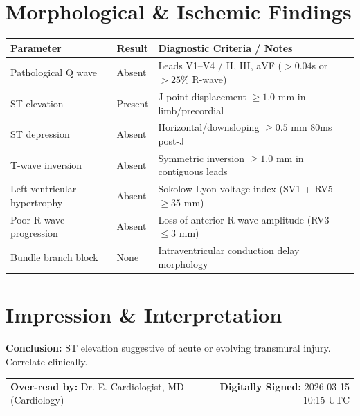 \documentclass[10pt,a4paper]{article}
\begin{document}
\section*{Morphological \& Ischemic Findings}

\begin{tabular}{@{} p{6.8cm} p{2.8cm} p{5.5cm} @{}}
  \toprule
  \textbf{Parameter} & \textbf{Result} & \textbf{Diagnostic Criteria / Notes} \\
  \midrule
  Pathological Q wave & Absent & Leads V1--V4 / II, III, aVF ($>0.04$s or $>25$\% R-wave) \\
  ST elevation & Present & J-point displacement $\ge 1.0$ mm in limb/precordial \\
  ST depression & Absent & Horizontal/downsloping $\ge 0.5$ mm 80ms post-J \\
  T-wave inversion & Absent & Symmetric inversion $\ge 1.0$ mm in contiguous leads \\
  Left ventricular hypertrophy & Absent & Sokolow-Lyon voltage index (SV1 + RV5 $\ge 35$ mm) \\
  Poor R-wave progression & Absent & Loss of anterior R-wave amplitude (RV3 $\le 3$ mm) \\
  Bundle branch block & None & Intraventricular conduction delay morphology \\
  \bottomrule
\end{tabular}

\vspace{12pt}

\section*{Impression \& Interpretation}

\noindent
\textbf{Conclusion:} ST elevation suggestive of acute or evolving transmural injury. Correlate clinically.

\vspace{18pt}

\noindent
\begin{tabular*}{\textwidth}{@{} l @{\extracolsep{\fill}} r @{}}
  \textbf{Over-read by:} Dr. E. Cardiologist, MD (Cardiology) & \textbf{Digitally Signed:} 2026-03-15 10:15 UTC \\
\end{tabular*}
\end{document}
